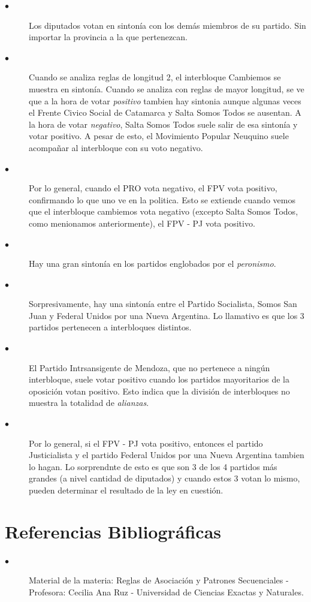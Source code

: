 \documentclass{endm}
\begin{document}
\begin{description}

\item[$\bullet$] Los diputados votan en sintonía con los demás miembros de su partido. Sin importar la provincia a la que pertenezcan.

\item[$\bullet$] Cuando se analiza reglas de longitud 2, el interbloque Cambiemos se muestra en sintonía. Cuando se analiza con reglas de mayor longitud, se ve que a la hora de votar \textit{positivo} tambien hay sintonia aunque algunas veces el Frente Civico Social de Catamarca y Salta Somos Todos se ausentan. A la hora de votar \textit{negativo}, Salta Somos Todos suele salir de esa sintonía y votar positivo. A pesar de esto, el Movimiento Popular Neuquino suele acompañar al interbloque con su voto negativo.

\item[$\bullet$] Por lo general, cuando el PRO vota negativo, el FPV vota positivo, confirmando lo que uno ve en la politica. Esto se extiende cuando vemos que el interbloque cambiemos vota negativo (excepto Salta Somos Todos, como menionamos anteriormente), el FPV - PJ vota positivo.

\item[$\bullet$] Hay una gran sintonía en los partidos englobados por el \textit{peronismo}.

\item[$\bullet$] Sorpresivamente, hay una sintonía entre el Partido Socialista, Somos San Juan y Federal Unidos por una Nueva Argentina. Lo llamativo es que los 3 partidos pertenecen a interbloques distintos.

\item[$\bullet$] El Partido Intrsansigente de Mendoza, que no pertenece a ningún interbloque, suele votar positivo cuando los partidos mayoritarios de la oposición votan positivo. Esto indica que la división de interbloques no muestra la totalidad de \textit{alianzas}.

\item[$\bullet$] Por lo general, si el FPV - PJ vota positivo, entonces el partido Justicialista y el partido Federal Unidos por una Nueva Argentina tambien lo hagan. Lo sorprendnte de esto es que son 3 de los 4 partidos más grandes (a nivel cantidad de diputados) y cuando estos 3 votan lo mismo, pueden determinar el resultado de la ley en cuestión.

\end{description}

\section{Referencias Bibliográficas}

\begin{description}
\item[$\bullet$]Material de la materia: Reglas de Asociación y Patrones Secuenciales - Profesora: Cecilia Ana Ruz - Universidad de Ciencias Exactas y Naturales.
\end{description}
\end{document}

